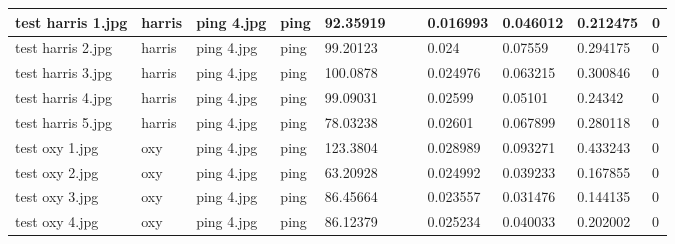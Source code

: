 \begin{landscape}
\begin{longtable}{|p{2cm}|p{1.5cm}|p{2cm}|p{1.5cm}|p{2cm}|p{1cm}|p{2cm}|p{2cm}|p{2cm}|p{2cm}|p{1cm}|}
		test harris 1.jpg    & harris           & ping 4.jpg            & ping                        & 92.35919              &                         &                            & 0.016993              & 0.046012              & 0.212475                 & 0                \\ \hline
		test harris 2.jpg    & harris           & ping 4.jpg            & ping                        & 99.20123              &                         &                            & 0.024                 & 0.07559               & 0.294175                 & 0                \\ \hline
		test harris 3.jpg    & harris           & ping 4.jpg            & ping                        & 100.0878              &                         &                            & 0.024976              & 0.063215              & 0.300846                 & 0                \\ \hline
		test harris 4.jpg    & harris           & ping 4.jpg            & ping                        & 99.09031              &                         &                            & 0.02599               & 0.05101               & 0.24342                  & 0                \\ \hline
		test harris 5.jpg    & harris           & ping 4.jpg            & ping                        & 78.03238              &                         &                            & 0.02601               & 0.067899              & 0.280118                 & 0                \\ \hline
		test oxy 1.jpg       & oxy              & ping 4.jpg            & ping                        & 123.3804              &                         &                            & 0.028989              & 0.093271              & 0.433243                 & 0                \\ \hline
		test oxy 2.jpg       & oxy              & ping 4.jpg            & ping                        & 63.20928              &                         &                            & 0.024992              & 0.039233              & 0.167855                 & 0                \\ \hline
		test oxy 3.jpg       & oxy              & ping 4.jpg            & ping                        & 86.45664              &                         &                            & 0.023557              & 0.031476              & 0.144135                 & 0                \\ \hline
		test oxy 4.jpg       & oxy              & ping 4.jpg            & ping                        & 86.12379              &                         &                            & 0.025234              & 0.040033              & 0.202002                 & 0                \\ \hline

\end{longtable}
\end{landscape}

